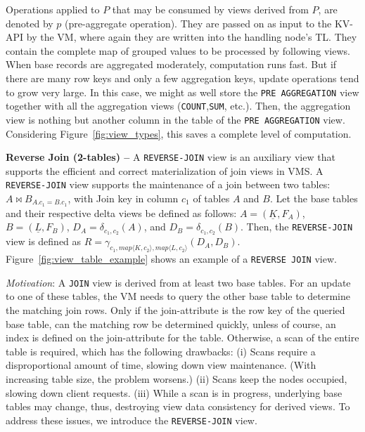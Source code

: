 Operations applied to $P$ that may be consumed by views derived from
$P$, are denoted by $p$ (pre-aggregate operation). They are passed on
as input to the KV-API by the VM, where again they are written into
the handling node's TL.  They contain the complete map of grouped values
to be processed by following views. When base records are aggregated 
moderately, computation runs fast. But if there are many row keys and 
only a few aggregation keys, update operations tend to grow very large. 
In this case, we might as well store the \texttt{PRE AGGREGATION} view
together with all the aggregation views (\texttt{COUNT},\texttt{SUM}, etc.).
Then, the aggregation view is nothing but another column in the table
of the \texttt{PRE AGGREGATION} view. Considering 
Figure~\ref{fig:view_types}, this saves a complete level of computation.

%




\noindent  
\textbf{Reverse Join (2-tables) --} A \texttt{REVERSE-JOIN} view is an
auxiliary view that supports the efficient and correct materialization
of join views in VMS.  A \texttt{REVERSE-JOIN} view supports the
maintenance of a join between two tables: $A \bowtie B_{A.c_1=B.c_1}$,
with Join key in column $c_1$ of tables $A$ and $B$.  Let the base
tables and their respective delta views be defined as follows:
$A=(\underline {K},F_A)$, $B=(\underline{L}, F_B)$,
$D_A=\delta_{c_1,c_2}(A)$, and $D_B=\delta_{c_1,c_2} (B)$. Then, the
\texttt{REVERSE-JOIN} view is defined as $R=\gamma_{c_1, map\langle K,c_2
  \rangle, map\langle L,c_2\rangle}(D_A,D_B)$. Figure~\ref{fig:view_table_example}
 shows an example of a \texttt{REVERSE JOIN} view. 

\noindent  
\textit{Motivation}: A \texttt{JOIN} view is derived from at least two
base tables. For an update to one of these tables, the VM needs to
query the other base table to determine the matching join rows. Only
if the join-attribute is the row key of the queried base table, can
the matching row be determined quickly, unless of course, an index is
defined on the join-attribute for the table.  Otherwise, a scan of the
entire table is required, which has the following drawbacks: (i) Scans
require a disproportional amount of time, slowing down view
maintenance. (With increasing table size, the problem worsens.) (ii)
Scans keep the nodes occupied, slowing down client requests.  (iii)
While a scan is in progress, underlying base tables may change, thus,
destroying view data consistency for derived views. To address these 
issues, we introduce the \texttt{REVERSE-JOIN} view.

